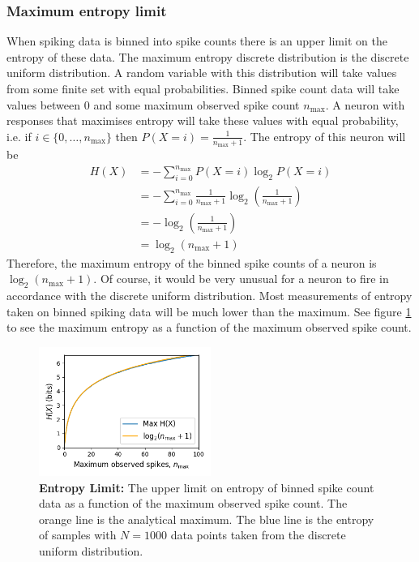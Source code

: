         \subsubsection{Maximum entropy limit}\label{sec:entropy_limit}
        When spiking data is binned into spike counts there is an upper limit on the entropy of these data. The maximum entropy discrete distribution is the discrete uniform distribution. A random variable with this distribution will take values from some finite set with equal probabilities. Binned spike count data will take values between $0$ and some maximum observed spike count $n_{\max}$. A neuron with responses that maximises entropy will take these values with equal probability, i.e. if $i \in \lbrace 0, \dots, n_{\max} \rbrace$ then $P(X = i) = \frac{1}{n_{\max} + 1}$. The entropy of this neuron will be
        \begin{align*}
          H(X)  &= - \sum_{i=0}^{n_{\max}} P(X = i) \log _2 P(X=i) \\
                &= - \sum_{i=0}^{n_{\max}} \frac{1}{n_{\max} + 1} \log_2 \left( \frac{1}{n_{\max} + 1} \right) \\
                &= - \log_2 \left( \frac{1}{n_{\max} + 1} \right) \\
                &= \log_2 \left( n_{\max} + 1 \right)
        \end{align*}
        Therefore, the maximum entropy of the binned spike counts of a neuron is $\log _2 \left( n_{\max} + 1 \right)$. Of course, it would be very unusual for a neuron to fire in accordance with the discrete uniform distribution. Most measurements of entropy taken on binned spiking data will be much lower than the maximum. See figure \ref{fig:entropy_limit} to see the maximum entropy as a function of the maximum observed spike count.

        \begin{figure}[h]
          \centering
          \includegraphics[width=0.5\textwidth]{figures/eight_probe/entropy_limit.png}
          \caption{\textbf{Entropy Limit:} The upper limit on entropy of binned spike count data as a function of the maximum observed spike count. The orange line is the analytical maximum. The blue line is the entropy of samples with $N=1000$ data points taken from the discrete uniform distribution.}
          \label{fig:entropy_limit}
        \end{figure}

